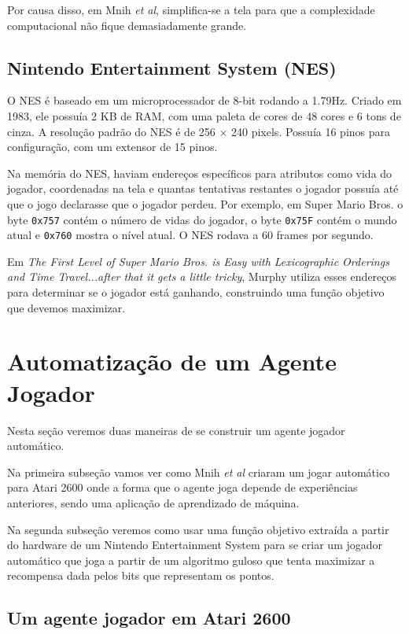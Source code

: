 \documentclass[a4paper,10pt]{article}
\theoremstyle{plain}
\begin{document}
Por causa disso, em Mnih \textit{et al}\cite{mnih-et-al}, simplifica-se a tela para que a
complexidade computacional não fique demasiadamente grande.

\subsection{Nintendo Entertainment System (NES)}

O NES é baseado em um microprocessador de 8-bit rodando a 1.79Hz. Criado em 1983, ele possuía 2 KB
de RAM, com uma paleta de cores de 48 cores e 6 tons de cinza. A resolução padrão do NES é de 256
$\times$ 240 pixels. Possuía 16 pinos para configuração, com um extensor de 15 pinos.

Na memória do NES, haviam endereços específicos para atributos como vida do jogador, coordenadas na
tela e quantas tentativas restantes o jogador possuía até que o jogo declarasse que o jogador
perdeu. Por exemplo, em Super Mario Bros. o byte \texttt{0x757} contém o número de vidas do
jogador, o byte \texttt{0x75F} contém o mundo atual e \texttt{0x760} mostra o nível atual. O NES
rodava a 60 frames por segundo.

Em \textit{The First Level of Super Mario Bros. is Easy with Lexicographic Orderings and Time
Travel...\small after that it gets a little tricky}, Murphy utiliza esses endereços para determinar
se o jogador está ganhando, construindo uma função objetivo que devemos maximizar.

\section{Automatização de um Agente Jogador}

Nesta seção veremos duas maneiras de se construir um agente jogador automático.

Na primeira subseção vamos ver como Mnih \textit{et al} criaram um jogar automático para Atari 2600
onde a forma que o agente joga depende de experiências anteriores, sendo uma aplicação de
aprendizado de máquina.

Na segunda subseção veremos como usar uma função objetivo extraída a partir do hardware de um
Nintendo Entertainment System para se criar um jogador automático que joga a partir de um algoritmo
guloso que tenta maximizar a recompensa dada pelos bits que representam os pontos.

\subsection{Um agente jogador em Atari 2600}
\end{document}
